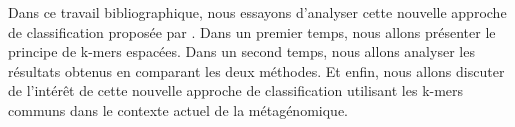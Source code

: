           Dans ce travail bibliographique, nous essayons d'analyser cette nouvelle approche de classification proposée par \cite{Brinda2015}.
          Dans un premier temps, nous allons présenter le principe de k-mers espacées. Dans un second temps, nous allons analyser les résultats obtenus en comparant les deux méthodes. Et enfin, nous allons discuter de l'intérêt de cette nouvelle approche de classification utilisant les k-mers communs dans le contexte actuel de la métagénomique.